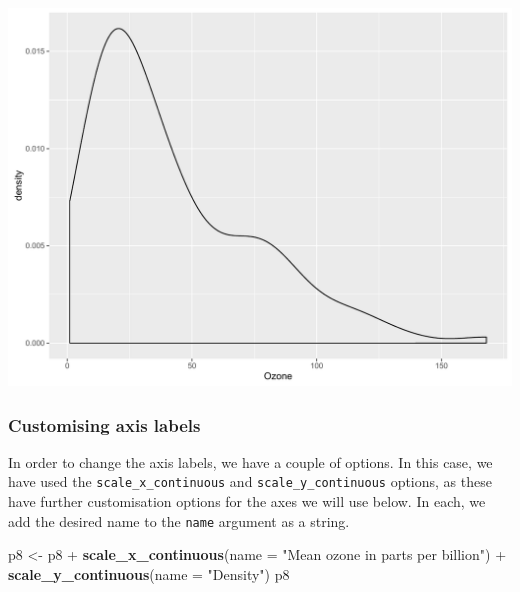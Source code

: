 \documentclass[]{article}
\newenvironment{Shaded}{\begin{snugshade}}{\end{snugshade}}
\newcommand{\KeywordTok}[1]{\textcolor[rgb]{0.13,0.29,0.53}{\textbf{{#1}}}}
\newcommand{\DataTypeTok}[1]{\textcolor[rgb]{0.13,0.29,0.53}{{#1}}}
\newcommand{\StringTok}[1]{\textcolor[rgb]{0.31,0.60,0.02}{{#1}}}
\newcommand{\NormalTok}[1]{{#1}}
\begin{document}
\begin{center}\includegraphics{0_all_posts_pdf/density_1-1} \end{center}

\subsubsection{Customising axis labels}\label{customising-axis-labels-1}

In order to change the axis labels, we have a couple of options. In this
case, we have used the \texttt{scale\_x\_continuous} and
\texttt{scale\_y\_continuous} options, as these have further
customisation options for the axes we will use below. In each, we add
the desired name to the \texttt{name} argument as a string.

\begin{Shaded}
\begin{Highlighting}[]
\NormalTok{p8 <-}\StringTok{ }\NormalTok{p8 +}\StringTok{ }\KeywordTok{scale_x_continuous}\NormalTok{(}\DataTypeTok{name =} \StringTok{"Mean ozone in parts per billion"}\NormalTok{) +}
\StringTok{      }\KeywordTok{scale_y_continuous}\NormalTok{(}\DataTypeTok{name =} \StringTok{"Density"}\NormalTok{)}
\NormalTok{p8}
\end{Highlighting}
\end{Shaded}
\end{document}
